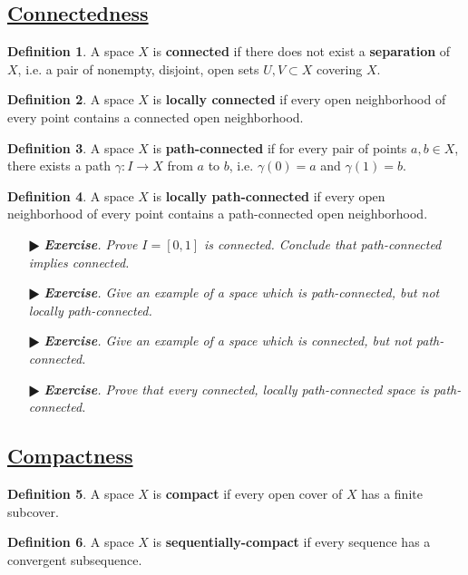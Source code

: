 \documentclass[11pt]{amsart}
\theoremstyle{definition}
\newtheorem*{definition*}{Definition}
\renewcommand\:{\colon}
\newcommand{\1}{\mathds{1}}
\newcommand{\exc}[1]{\vspace{-2.5pt}\begin{itemize}[leftmargin=15pt]\item[$\RHD$] \textit{\textbf{Exercise}. #1}\end{itemize}}
\begin{document}
\vskip20pt



\subsection*{\underline{Connectedness}}

\begin{definition*}
	A space $X$ is \textbf{connected} if there does not exist a \textbf{separation} of $X$, i.e. a pair of nonempty, disjoint, open sets $U, V \subset X$ covering $X$.
\end{definition*}

\begin{definition*}
	A space $X$ is \textbf{locally connected} if every open neighborhood of every point contains a connected open neighborhood.
\end{definition*}

\begin{definition*}
	A space $X$ is \textbf{path-connected} if for every pair of points $a, b \in X$, there exists a path $\gamma\: I \to X$ from $a$ to $b$, i.e. $\gamma(0) = a$ and $\gamma(1) = b$.
\end{definition*}

\begin{definition*}
	A space $X$ is \textbf{locally path-connected} if every open neighborhood of every point contains a path-connected open neighborhood.
\end{definition*}

\exc{Prove $I = [0,1]$ is connected. Conclude that path-connected implies connected.}
\exc{Give an example of a space which is path-connected, but not locally path-connected.}
\exc{Give an example of a space which is connected, but not path-connected.}
\exc{Prove that every connected, locally path-connected space is path-connected.}

\vskip20pt



\subsection*{\underline{Compactness}}

\begin{definition*}
	A space $X$ is \textbf{compact} if every open cover of $X$ has a finite subcover.
\end{definition*}

\begin{definition*}
	A space $X$ is \textbf{sequentially-compact} if every sequence has a convergent subsequence.
\end{definition*}
\end{document}
